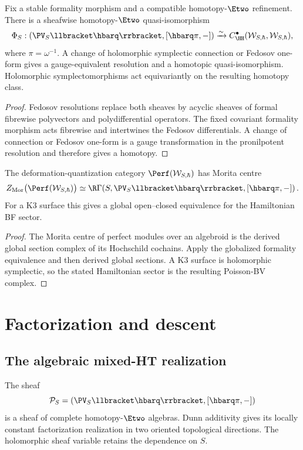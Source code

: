 \begin{theorem}
Fix a stable formality morphism and a compatible homotopy-$\Etwo$ refinement.  There is a sheafwise homotopy-$\Etwo$ quasi-isomorphism
\[
 \Phi_S:
 \left(\PV_S\llbracket\hbarq\rrbracket,[\hbarq\pi,-]\right)
 \xrightarrow{\sim}
 C^\bullet_{\HH}(\mathcal W_{S,\hbar},\mathcal W_{S,\hbar}),
\]
where $\pi=\omega^{-1}$.  A change of holomorphic symplectic connection or Fedosov one-form gives a gauge-equivalent resolution and a homotopic quasi-isomorphism.  Holomorphic symplectomorphisms act equivariantly on the resulting homotopy class.
\end{theorem}
\begin{proof}
Fedosov resolutions replace both sheaves by acyclic sheaves of formal fibrewise polyvectors and polydifferential operators.  The fixed covariant formality morphism acts fibrewise and intertwines the Fedosov differentials.  A change of connection or Fedosov one-form is a gauge transformation in the pronilpotent resolution and therefore gives a homotopy.
\end{proof}

\begin{corollary}
The deformation-quantization category $\Perf(\mathcal W_{S,\hbar})$ has Morita centre
\[
 Z_{\mathrm{Mor}}\bigl(\Perf(\mathcal W_{S,\hbar})\bigr)
 \simeq
 \R\Gamma\!
 \left(S,\PV_S\llbracket\hbarq\rrbracket,[\hbarq\pi,-]\right).
\]
For a K3 surface this gives a global open--closed equivalence for the Hamiltonian BF sector.
\end{corollary}
\begin{proof}
The Morita centre of perfect modules over an algebroid is the derived global section complex of its Hochschild cochains.  Apply the globalized formality equivalence and then derived global sections.  A K3 surface is holomorphic symplectic, so the stated Hamiltonian sector is the resulting Poisson-BV complex.
\end{proof}

\chapter{Factorization and descent}
\section{The algebraic mixed-HT realization}
The sheaf
\[
 \mathcal P_S=
 \left(\PV_S\llbracket\hbarq\rrbracket,[\hbarq\pi,-]\right)
\]
is a sheaf of complete homotopy-$\Etwo$ algebras.  Dunn additivity gives its locally constant factorization realization in two oriented topological directions.  The holomorphic sheaf variable retains the dependence on $S$.

